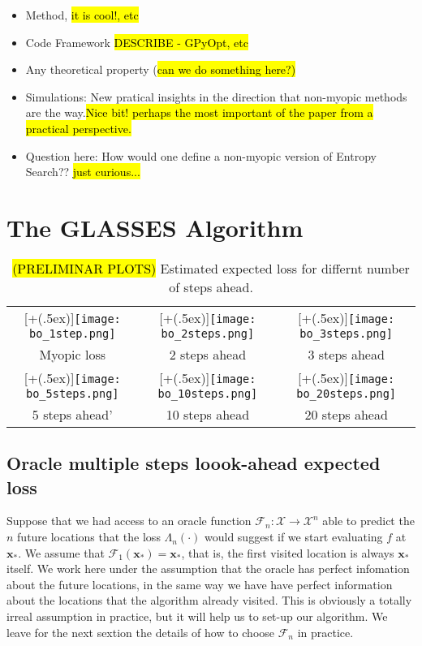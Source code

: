 \documentclass[twoside]{article}
\newcommand{\bx}{\textbf{x}}
\newcommand{\future}{\mathcal{F}}
\newcommand*{\addheight}[2][.5ex]{%
  \raisebox{0pt}[\dimexpr\height+(#1)\relax]{#2}%
}
\begin{document}
\begin{itemize}
\item Method, \hl{it is cool!, etc}
\item Code Framework \hl{DESCRIBE - GPyOpt, etc}
\item Any theoretical property (\hl{can we do something here?)}
\item Simulations: New pratical insights in the direction that non-myopic methods are the way.\hl{Nice bit! perhaps the most important of the paper from a practical perspective.}
\item Question here: How would one define a non-myopic version of Entropy Search?? \hl{just curious...}
\end{itemize}




 \section{The GLASSES  Algorithm}


\begin{table*}
\begin{tabular}{ccc}
      \addheight{\texttt{[image: bo\_1step.png]}} &
      \addheight{\texttt{[image: bo\_2steps.png]}}  &
      \addheight{\texttt{[image: bo\_3steps.png]}}\\
      \small Myopic loss &  \small 2 steps ahead & \small 3 steps ahead \\
      \addheight{\texttt{[image: bo\_5steps.png]}} &
      \addheight{\texttt{[image: bo\_10steps.png]}}  &
      \addheight{\texttt{[image: bo\_20steps.png]}}\\
      \small \small 5 steps ahead' & \small 10 steps ahead & \small 20 steps ahead \\
\end{tabular}\caption{\hl{(PRELIMINAR PLOTS)} Estimated expected loss for differnt number of steps ahead.}
\end{table*}

\subsection{Oracle multiple steps loook-ahead expected loss}
Suppose that  we had access to an oracle function $\future_{n}: {\mathcal X}\rightarrow  {\mathcal X}^n$ able to predict the $n$ future  locations that the loss $\Lambda_n(\cdot)$ would suggest if we start evaluating $f$ at $\bx_*$. We assume that $\future_{1}(\bx_*)=\bx_*$, that is, the first visited location is always $\bx_*$ itself. We work here under the assumption that the oracle has perfect infomation about the future locations, in the same way we have have perfect information about the locations that the algorithm already visited. This is obviously a totally irreal assumption in practice, but it will help us to set-up our algorithm. We leave for the next sextion the details of how to choose $\future_{n}$ in practice. 
\end{document}
